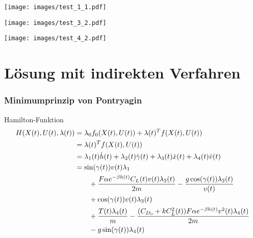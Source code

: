 \documentclass[aspectratio=169]{beamer}
\begin{document}
\begin{frame}
  \begin{center}
    \texttt{[image: images/test\_1\_1.pdf]}
  \end{center}
\end{frame}

\begin{frame}
 \begin{center}
  \texttt{[image: images/test\_3\_2.pdf]}
 \end{center}
\end{frame}

\begin{frame}
 \begin{center}
  \texttt{[image: images/test\_4\_2.pdf]}
 \end{center}
\end{frame}


\section{Lösung mit indirekten Verfahren}
\begin{frame}
  \frametitle{Minimumprinzip von Pontryagin}
   \begin{center}
  \scriptsize
  \begin{block}{Hamilton-Funktion}  
          \vspace{-5mm}
 \begin{align*} 
        H(X(t),U(t),\lambda(t)) &= \lambda_0 f_0(X(t),U(t)) + \lambda(t)^T f(X(t),U(t)) \\\
        &= \lambda(t)^T f(X(t),U(t)) \\\
        &= \lambda_1(t) \dot{h}(t) + \lambda_2(t) \dot{\gamma}(t) + \lambda_3(t) \dot{x}(t) + \lambda_4(t) \dot{v}(t) \\\
        &= \sin(\gamma(t)) v(t) \lambda_1 \\\
        &\hspace{7mm} + \dfrac{F \alpha e^{-\beta h(t)} C_L(t) v(t) \lambda_2(t)}{2m} - \dfrac{g \cos(\gamma(t)) \lambda_2(t)}{v(t)} \\\
        &\hspace{7mm} + \cos(\gamma(t)) v(t) \lambda_3(t) \\\
        &\hspace{7mm} + \dfrac{T(t) \lambda_4(t)}{m} - \dfrac{(C_{D_0} + k C_L^2(t)) F \alpha e^{-\beta h(t)} v^2(t) \lambda_4(t)}{2m} \\\
        &\hspace{7mm} - g \sin(\gamma(t)) \lambda_4(t)
\end{align*}
\end{block}
 \end{center}
\end{frame}
\end{document}
